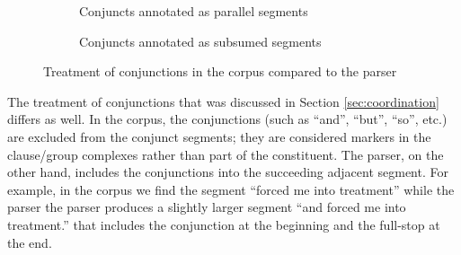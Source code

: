     \begin{figure}[!ht]
        \centering
        \begin{subfigure}[b]{0.47\textwidth}
            \centering
            \caption{Conjuncts annotated as parallel segments}
            \label{fig:segment-conjunction-paralel}
        \end{subfigure}
        \quad
        \begin{subfigure}[b]{0.47\textwidth}
            \centering
            \caption{Conjuncts annotated as subsumed segments}
            \label{fig:segment-conjunction-subsumed}
        \end{subfigure}
        \caption{Treatment of conjunctions in the corpus compared to the parser}
        \label{fig:conjunction-treatment}
    \end{figure}
    
    The treatment of conjunctions that was discussed in Section \ref{sec:coordination} differs as well. In the corpus, the conjunctions (such as ``and'', ``but'', ``so'', etc.) are excluded from the conjunct segments; they are considered markers in the clause/group complexes rather than part of the constituent. The parser, on the other hand, includes the conjunctions into the succeeding adjacent segment. For example, in the corpus we find the segment ``forced me into treatment'' while the parser the parser produces a slightly larger segment ``and forced me into treatment.'' that includes the conjunction at the beginning and the full-stop at the end.
    
